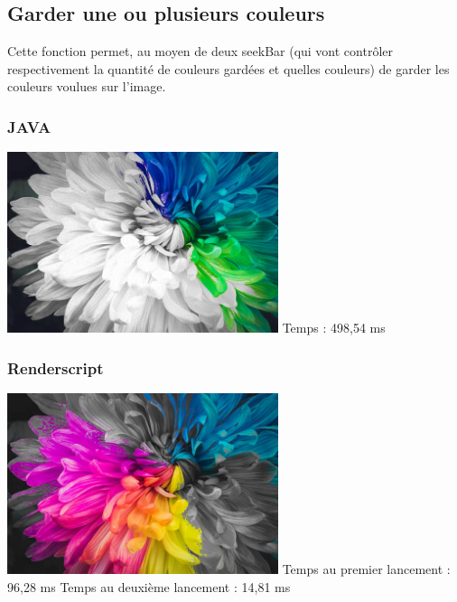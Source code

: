 \documentclass{article}
\begin{document}
\subsection{Garder une ou plusieurs couleurs}
\medbreak

Cette fonction permet, au moyen de deux seekBar (qui vont contrôler respectivement la quantité de couleurs gardées et quelles couleurs) de garder les couleurs voulues sur l'image.
\medbreak

\subsubsection{JAVA}
\medbreak

\begin{center}
    \medbreak
    \includegraphics[width=300px]{./Images/Multicolor/Keep_Color.jpg}
    \bigbreak
    Temps  : 498,54 ms
\end{center}

\bigbreak

\subsubsection{Renderscript}
\medbreak

\begin{center}
    \medbreak
    \includegraphics[width=300px]{./Images/Multicolor/Keep_Color_RS.jpg}
    \bigbreak
    Temps au premier lancement : 96,28 ms
    \medbreak
    Temps au deuxième lancement : 14,81 ms
\end{center}
\end{document}
